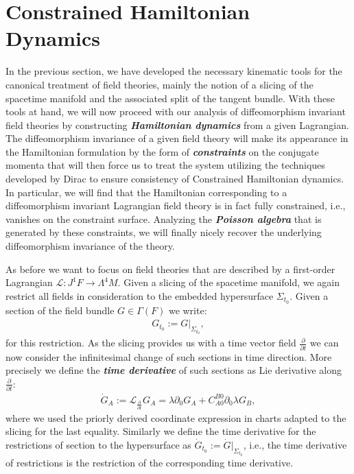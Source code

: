 \section{Constrained Hamiltonian Dynamics}\label{ConstrainedDyn}
In the previous section, we have developed the necessary kinematic tools for the canonical treatment of field theories, mainly the notion of a slicing of the spacetime manifold and the associated split of the tangent bundle. With these tools at hand, we will now proceed with our analysis of diffeomorphism invariant field theories by constructing \textbf{\textit{Hamiltonian dynamics}} from a given Lagrangian.
The diffeomorphism invariance of a given field theory will make its appearance in the Hamiltonian formulation by the form of \textit{\textbf{constraints}} on the conjugate momenta that will then force us to treat the system utilizing the techniques developed by Dirac to ensure consistency of Constrained Hamiltonian dynamics.
In particular, we will find that the Hamiltonian corresponding to a diffeomorphism invariant Lagrangian field theory is in fact fully constrained, i.e., vanishes on the constraint surface. Analyzing the \textit{\textbf{Poisson algebra}} that is generated by these constraints, we will finally nicely recover the underlying diffeomorphism invariance of the theory.

As before we want to focus on field theories that are described by a first-order Lagrangian $\mathcal{L} : J^1F \rightarrow \Lambda^4M$. Given a slicing of the spacetime manifold, we again restrict all fields in consideration to the embedded hypersurface $\Sigma_{t_0}$. Given a section of the field bundle $G \in \Gamma(F)$ we write: 
\begin{align}
     G_{t_0} := G \vert _{\Sigma_{t_0}},
\end{align}
for this restriction. As the slicing provides us with a time vector field $\frac{\partial}{\partial t}$ we can now consider the infinitesimal change of such sections in time direction. More precisely we define the \textbf{\textit{time derivative}} of such sections as Lie derivative along $\frac{\partial}{\partial t}$: 
\begin{align}
    \dot{G}_A := \mathcal{L}_{\frac{\partial}{\partial t}}G_A = \lambda \partial_0 G_A + C^{B0}_{A0} \partial_0 \lambda G_B,
\end{align}
where we used the priorly derived coordinate expression in charts adapted to the slicing for the last equality. Similarly we define the time derivative for the restrictions of section to the hypersurface as $\dot{G}_{t_0}:= \dot{G} \vert_{\Sigma_{t_0}}$, i.e., the time derivative of restrictions is the restriction of the corresponding time derivative.


